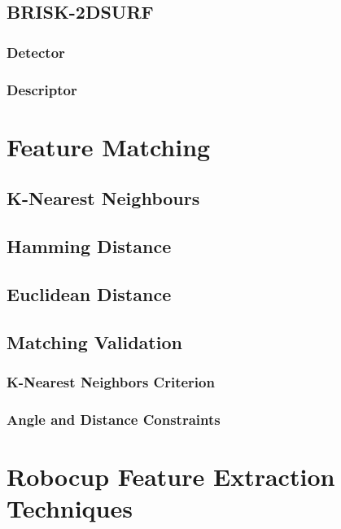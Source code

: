 \documentclass{article}
\begin{document}
\subsection{BRISK-2DSURF}
\label{sec:brisk2dsurf}

\subsubsection{Detector}
\label{brisk2dsurfDetect}

\subsubsection{Descriptor}
\label{brisk2dsurfDescribe}


\section{Feature Matching}
\label{sec:matching}

\subsection{K-Nearest Neighbours}
\label{sec:knn}

\subsection{Hamming Distance}
\label{sec:hamming}

\subsection{Euclidean Distance}
\label{sec:euclidean}

\subsection{Matching Validation}
\label{sec:validation}

\subsubsection{K-Nearest Neighbors Criterion}
\label{sec:knnMatching}

\subsubsection{Angle and Distance Constraints}
\label{sec:angleDistanceConstraints}

\section{Robocup Feature Extraction Techniques}
\label{sec:realtimeFeatureExtraction}
\end{document}
